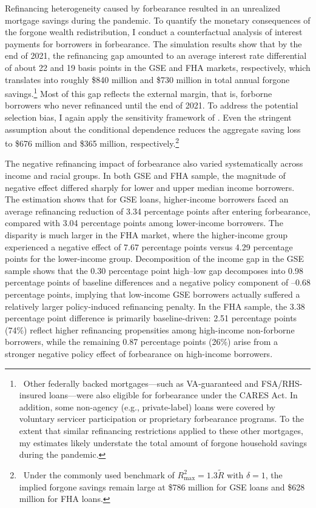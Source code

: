 \documentclass[11pt]{article}
\begin{document}
Refinancing heterogeneity caused by forbearance resulted in an unrealized mortgage savings during the pandemic. To quantify the monetary consequences of the forgone wealth redistribution, I conduct a counterfactual analysis of interest payments for borrowers in forbearance. The simulation results show that by the end of 2021, the refinancing gap amounted to an average interest rate differential of about 22 and 19 basis points in the GSE and FHA markets, respectively, which translates into roughly \$840 million and \$730 million in total annual forgone savings.\footnote{~Other federally backed mortgages—such as VA-guaranteed and FSA/RHS-insured loans—were also eligible for forbearance under the CARES Act. In addition, some non-agency (e.g., private-label) loans were covered by voluntary servicer participation or proprietary forbearance programs. To the extent that similar refinancing restrictions applied to these other mortgages, my estimates likely understate the total amount of forgone household savings during the pandemic.} Most of this gap reflects the external margin, that is, forborne borrowers who never refinanced until the end of 2021.  To address the potential selection bias, I again apply the sensitivity framework of \citet{oster2019}. Even the stringent assumption about the conditional dependence reduces the aggregate saving loss to \$676 million and \$365 million, respectively.\footnote{~Under the commonly used benchmark of $R^2_{\max} = 1.3\tilde{R}$ with $\delta=1$, the implied forgone savings remain large at \$786 million for GSE loans and \$628 million for FHA loans.} 


The negative refinancing impact of forbearance also varied systematically across income and racial groups. In both GSE and FHA sample, the magnitude of negative effect differed sharply for lower and upper median income borrowers. The estimation shows that for GSE loans, higher-income borrowers faced an average refinancing reduction of 3.34 percentage points after entering forbearance, compared with 3.04 percentage points among lower-income borrowers. The disparity is much larger in the FHA market, where the higher-income group experienced a negative effect of 7.67 percentage points versus 4.29 percentage points for the lower-income group. Decomposition of the income gap in the GSE sample shows that the 0.30 percentage point high–low gap decomposes into 0.98 percentage points of baseline differences and a negative policy component of –0.68 percentage points, implying that low-income GSE borrowers actually suffered a relatively larger policy-induced refinancing penalty. In the FHA sample, the 3.38 percentage point difference is primarily baseline-driven: 2.51 percentage points (74\%) reflect higher refinancing propensities among high-income non-forborne borrowers, while the remaining 0.87 percentage points (26\%) arise from a stronger negative policy effect of forbearance on high-income borrowers.
\end{document}
